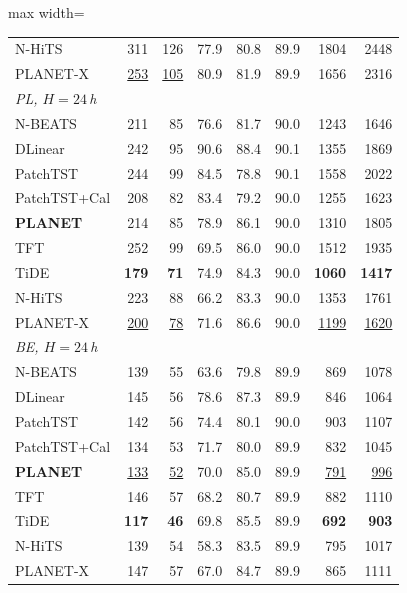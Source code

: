 \begin{table}[!t]
\begin{adjustbox}{max width=\linewidth}
\begin{tabular}{lrrrrrrr}
\quad N-HiTS & 311 & 126 & 77.9 & 80.8 & 89.9 & 1804 & 2448 \\
\quad PLANET-X & \underline{253} & \underline{105} & 80.9 & 81.9 & 89.9 & 1656 & 2316 \\
\midrule
\multicolumn{8}{l}{\textit{PL, $H=24$\,h}} \\
\quad N-BEATS & 211 & 85 & 76.6 & 81.7 & 90.0 & 1243 & 1646 \\
\quad DLinear & 242 & 95 & 90.6 & 88.4 & 90.1 & 1355 & 1869 \\
\quad PatchTST & 244 & 99 & 84.5 & 78.8 & 90.1 & 1558 & 2022 \\
\quad PatchTST+Cal & 208 & 82 & 83.4 & 79.2 & 90.0 & 1255 & 1623 \\
\quad \textbf{PLANET} & 214 & 85 & 78.9 & 86.1 & 90.0 & 1310 & 1805 \\
\quad TFT & 252 & 99 & 69.5 & 86.0 & 90.0 & 1512 & 1935 \\
\quad TiDE & \textbf{179} & \textbf{71} & 74.9 & 84.3 & 90.0 & \textbf{1060} & \textbf{1417} \\
\quad N-HiTS & 223 & 88 & 66.2 & 83.3 & 90.0 & 1353 & 1761 \\
\quad PLANET-X & \underline{200} & \underline{78} & 71.6 & 86.6 & 90.0 & \underline{1199} & \underline{1620} \\
\midrule
\multicolumn{8}{l}{\textit{BE, $H=24$\,h}} \\
\quad N-BEATS & 139 & 55 & 63.6 & 79.8 & 89.9 & 869 & 1078 \\
\quad DLinear & 145 & 56 & 78.6 & 87.3 & 89.9 & 846 & 1064 \\
\quad PatchTST & 142 & 56 & 74.4 & 80.1 & 90.0 & 903 & 1107 \\
\quad PatchTST+Cal & 134 & 53 & 71.7 & 80.0 & 89.9 & 832 & 1045 \\
\quad \textbf{PLANET} & \underline{133} & \underline{52} & 70.0 & 85.0 & 89.9 & \underline{791} & \underline{996} \\
\quad TFT & 146 & 57 & 68.2 & 80.7 & 89.9 & 882 & 1110 \\
\quad TiDE & \textbf{117} & \textbf{46} & 69.8 & 85.5 & 89.9 & \textbf{692} & \textbf{903} \\
\quad N-HiTS & 139 & 54 & 58.3 & 83.5 & 89.9 & 795 & 1017 \\
\quad PLANET-X & 147 & 57 & 67.0 & 84.7 & 89.9 & 865 & 1111 \\
\bottomrule
\end{tabular}
\end{adjustbox}
\end{table}
